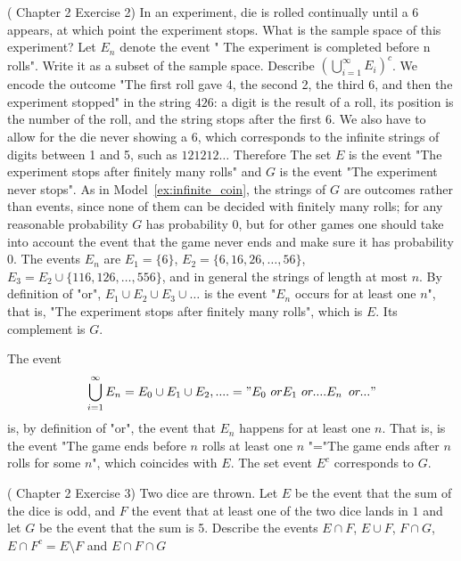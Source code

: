 \begin{ExerciseList}
	\Exercise
	\label{exercise:game_2}
    (\cite{Ross} Chapter 2 Exercise 2) In an experiment, die is rolled continually until a 6 appears, at which point the experiment stops. What is the sample space of this experiment? Let $E_n$ denote the event " The experiment is completed before n rolls". Write it as a subset of the sample space. Describe $\left(\bigcup_{i=1}^\infty E_i\right)^c$.
	\Answer We encode the outcome "The first roll gave 4, the second 2, the third 6, and then the experiment stopped" in the string $426$: a digit is the result of a roll, its position is the number of the roll, and the string stops after the first 6. We also have to allow for the die never showing a 6, which corresponds to the infinite strings of digits between 1 and 5, such as $121212\ldots$ Therefore 
	The set $E$ is the event "The experiment stops after finitely many rolls" and $G$ is the event "The experiment never stops". As in Model~\ref{ex:infinite_coin}, the strings of $G$ are outcomes rather than events, since none of them can be decided with finitely many rolls; for any reasonable probability $G$ has probability $0$, but for other games one should take into account the event that the game never ends and make sure it has probability 0. 
	The events $E_n$ are $E_1 = \{6\}$, $E_2 = \{6, 16, 26, \ldots, 56\}$, $E_3 = E_2 \cup \{116, 126, \ldots, 556\}$, and in general 
	the strings of length at most $n$. By definition of "or", $E_1 \cup E_2 \cup E_3 \cup \ldots$ is the event "$E_n$ occurs for at least one $n$", that is, "The experiment stops after finitely many rolls", which is $E$. Its complement is $G$.

The event $$\bigcup_{i=1}^\infty E_n= E_0\cup E_1\cup E_2,....= "E_0\,\, or E_1 \,\,or ....E_n \,\,\,or ..."$$
is, by definition of "or", the event that $E_n$ happens for at least one $n$. That is, is the event "The game ends before $n$ rolls at least one $n$ "="The game ends after $n$ rolls for some $n$", which coincides with $E$.
The set event $E^c$ corresponds to $G$. 

\Exercise (\cite{Ross} Chapter 2 Exercise 3)
Two dice are thrown. Let $E$ be the event that the sum of the dice is odd, and $F$ the event that at least one of the two dice lands in $1$ and let $G$ be the event that the sum is 5. Describe the events $E\cap F $, $E\cup F$, $F\cap G$, $E\cap F^c=E\setminus F$ and $E \cap F\cap G$


\end{ExerciseList}
